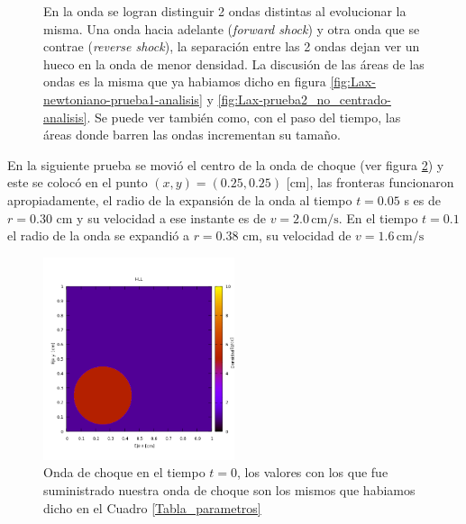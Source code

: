 \documentclass[12pt,a4paper]{book}
\begin{document}
\begin{figure}[H]
\caption{\label{fig:HLL-prueba1-analisis}En la onda se logran distinguir 2 ondas distintas al evolucionar la misma. Una onda hacia adelante (\emph{forward shock}) y otra onda que se contrae (\emph{reverse shock}), la separación entre las 2 ondas dejan ver un hueco en la onda de menor densidad. La discusión de las áreas de las ondas es la misma que ya habiamos dicho en figura \ref{fig:Lax-newtoniano-prueba1-analisis} y \ref{fig:Lax-prueba2_no_centrado-analisis}. Se puede ver también como, con el paso del tiempo, las áreas donde barren las ondas incrementan su tamaño.} 
\end{figure}


En la siguiente prueba se movió el centro de la onda de choque (ver figura \ref{fig:onda_choque4_t_0}) y este se colocó en el punto $(x,y) = (0.25,0.25)$ [cm], las fronteras funcionaron apropiadamente, el radio de la expansión de la onda al tiempo $t=0.05$ s es de $r = 0.30$ cm y su velocidad a ese instante es de $v = 2.0 \, \mathrm{cm}/\mathrm{s}$. En el tiempo $t = 0.1$  el radio de la onda se expandió a $r = 0.38$ cm, su velocidad de $v = 1.6 \, \mathrm{cm}/\mathrm{s}$

\begin{figure}[H]
\centering
\includegraphics[width=0.5\textwidth]{./Figuras/Pruebas/Prueba_onda_choque/onda_choque4_t_0}
\caption{\label{fig:onda_choque4_t_0}Onda de choque en el tiempo $t = 0$, los valores con los que fue suministrado nuestra onda de choque son los mismos que habiamos dicho en el Cuadro \ref{Tabla_parametros} } \label{fig:onda_choque4_t_0}
\end{figure}
\end{document}
